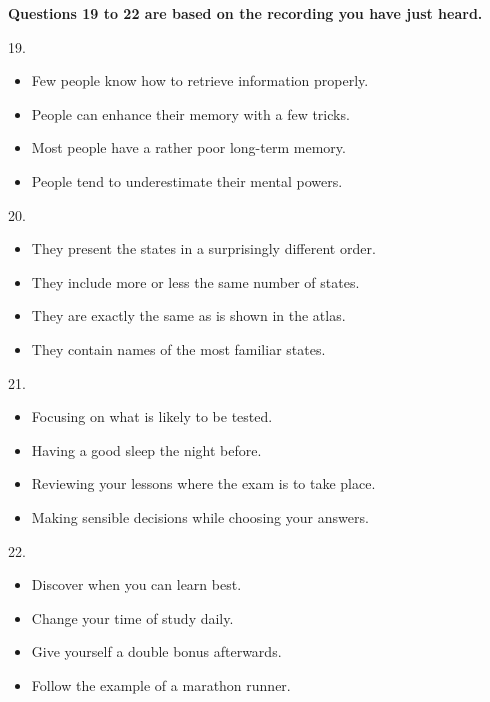 \documentclass[UTF8,11pt]{ctexart}
\begin{document}
\textbf{Questions 19 to 22 are based on the recording you have just heard.}


19.


\begin{itemize}[leftmargin=2em,itemsep=.2em,topsep=.4em]\item[A.] Few people know how to retrieve information properly.
\item[B.] People can enhance their memory with a few tricks.
\item[C.] Most people have a rather poor long-term memory.
\item[D.] People tend to underestimate their mental powers.
\end{itemize}

20.


\begin{itemize}[leftmargin=2em,itemsep=.2em,topsep=.4em]\item[A.] They present the states in a surprisingly different order.
\item[B.] They include more or less the same number of states.
\item[C.] They are exactly the same as is shown in the atlas.
\item[D.] They contain names of the most familiar states.
\end{itemize}

21.


\begin{itemize}[leftmargin=2em,itemsep=.2em,topsep=.4em]\item[A.] Focusing on what is likely to be tested.
\item[B.] Having a good sleep the night before.
\item[C.] Reviewing your lessons where the exam is to take place.
\item[D.] Making sensible decisions while choosing your answers.
\end{itemize}

22.


\begin{itemize}[leftmargin=2em,itemsep=.2em,topsep=.4em]\item[A.] Discover when you can learn best.
\item[B.] Change your time of study daily.
\item[C.] Give yourself a double bonus afterwards.
\item[D.] Follow the example of a marathon runner.
\end{itemize}
\end{document}
